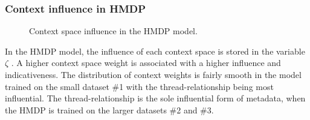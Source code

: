 \subsubsection{Context influence in HMDP}
\begin{figure}[H]%
\centering
{}%
\qquad
{}%
\caption{Context space influence in the HMDP model.}
\end{figure}
In the HMDP model, the influence of each context space is stored in the variable $\zeta$ \cite{DBLP:phd/dnb/Kling16}. A higher context space weight is associated with a higher influence and indicativeness. The distribution of context weights is fairly smooth in the model trained on the small dataset \#1 with the thread-relationship being most influential. The thread-relationship is the sole influential form of metadata, when the HMDP is trained on the larger datasets \#2 and \#3.

